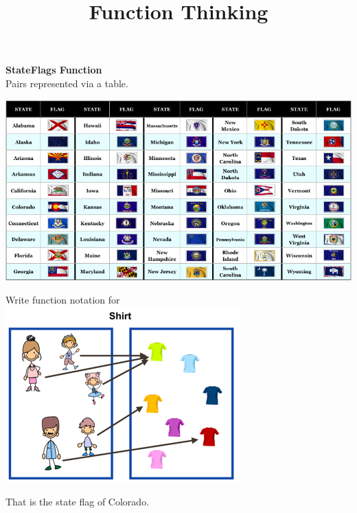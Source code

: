 \documentclass{ximera}
\title{Function Thinking}
\begin{document}
\begin{abstract}
\end{abstract}

\maketitle





\begin{center}
\textbf{StateFlags Function} \\
Pairs represented via a table. \\
\begin{image}
\includegraphics{pics/allStateFlags_med.png}
\end{image}
\end{center}






\begin{question}

Write function notation for \includegraphics{pics/shirt_func.png}

\begin{multipleChoice}
\end{multipleChoice}
\begin{feedback}
That is the state flag of Colorado.
\end{feedback}
\end{question}
\end{document}

